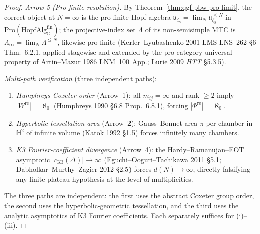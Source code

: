 \begin{proof}
\emph{Arrow 5 (Pro-finite resolution).} By
Theorem~\ref{thm:qgf-pbw-pro-limit}, the correct object at $N=\infty$
is the pro-finite Hopf algebra
$\mathfrak u_{\zeta_8}=\lim_N\mathfrak u_{\zeta_8}^{\le N}$ in
$\mathrm{Pro}(\mathrm{HopfAlg}^{\mathrm{fin}}_{\mathbb C})$; the
projective-index set $\Lambda$ of its non-semisimple MTC is
$\Lambda_\infty=\lim_N\Lambda^{\le N}$, likewise pro-finite
(Kerler--Lyubashenko 2001 LMS LNS~262 \S6 Thm.~6.2.1, applied
stagewise and extended by the pro-category universal property of
Artin--Mazur 1986 LNM~100 App.; Lurie 2009 \emph{HTT} \S5.3.5).

\emph{Multi-path verification} (three independent paths):
\begin{enumerate}[label=(V\arabic*)]
 \item \emph{Humphreys Coxeter-order} (Arrow~1): all $m_{ij}=\infty$
 and rank $\ge 2$ imply $|W^{\mathrm{re}}|=\aleph_0$ (Humphreys
 1990 \S6.8 Prop.~6.8.1), forcing
 $|\Phi^{\mathrm{re}}|=\aleph_0$.
 \item \emph{Hyperbolic-tessellation area} (Arrow~2): Gauss--Bonnet
 area $\pi$ per chamber in $\mathbb H^2$ of infinite volume
 (Katok 1992 \S1.5) forces infinitely many chambers.
 \item \emph{K3 Fourier-coefficient divergence} (Arrow~4): the
 Hardy--Ramanujan--EOT asymptotic
 $|c_{\mathrm{K3}}(\Delta)|\to\infty$
 (Eguchi--Ooguri--Tachikawa 2011 \S5.1; Dabholkar--Murthy--Zagier
 2012 \S2.5) forces $d(N)\to\infty$, directly falsifying any
 finite-plateau hypothesis at the level of multiplicities.
\end{enumerate}
The three paths are independent: the first uses the abstract Coxeter
group order, the second uses the hyperbolic-geometric tessellation, and
the third uses the analytic asymptotics of K3 Fourier coefficients.
Each separately suffices for \textup{(i)}--\textup{(iii)}.
\end{proof}

